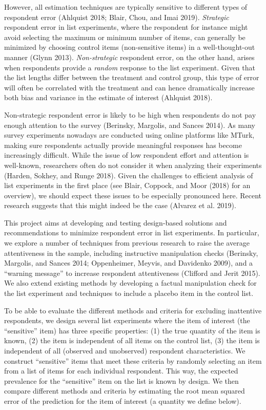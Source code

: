 \documentclass[]{article}
\begin{document}
However, all estimation techniques are typically sensitive to different
types of respondent error (Ahlquist 2018; Blair, Chou, and Imai 2019).
\emph{Strategic} respondent error in list experiments, where the
respondent for instance might avoid selecting the maximum or minimum
number of items, can generally be minimized by choosing control items
(non-sensitive items) in a well-thought-out manner (Glynn 2013).
\emph{Non-strategic} respondent error, on the other hand, arises when
respondents provide a \emph{random} response to the list experiment.
Given that the list lengths differ between the treatment and control
group, this type of error will often be correlated with the treatment
and can hence dramatically increase both bias and variance in the
estimate of interest (Ahlquist 2018).

Non-strategic respondent error is likely to be high when respondents do
not pay enough attention to the survey (Berinsky, Margolis, and Sances
2014). As many survey experiments nowadays are conducted using online
platforms like MTurk, making sure respondents actually provide
meaningful responses has become increasingly difficult. While the issue
of low respondent effort and attention is well-known, researchers often
do not consider it when analyzing their experiments (Harden, Sokhey, and
Runge 2018). Given the challenges to efficient analysis of list
experiments in the first place (see Blair, Coppock, and Moor (2018) for
an overview), we should expect these issues to be especially pronounced
here. Recent research suggests that this might indeed be the case
(Alvarez et al. 2019).

This project aims at developing and testing design-based solutions and
recommendations to minimize respondent error in list experiments. In
particular, we explore a number of techniques from previous research to
raise the average attentiveness in the sample, including instructive
manipulation checks (Berinsky, Margolis, and Sances 2014; Oppenheimer,
Meyvis, and Davidenko 2009), and a ``warning message'' to increase
respondent attentiveness (Clifford and Jerit 2015). We also extend
existing methods by developing a factual manipulation check for the list
experiment and techniques to include a placebo item in the control list.

To be able to evaluate the different methods and criteria for excluding
inattentive respondents, we design several list experiments where the
item of interest (the ``sensitive'' item) has three specific properties:
(1) the true quantity of the item is known, (2) the item is independent
of all items on the control list, (3) the item is independent of all
(observed and unobserved) respondent characteristics. We construct
``sensitive'' items that meet these criteria by randomly selecting an
item from a list of items for each individual respondent. This way, the
expected prevalence for the ``sensitive'' item on the list is known by
design. We then compare different methods and criteria by estimating the
root mean squared error of the prediction for the item of interest (a
quantity we define below).
\end{document}
